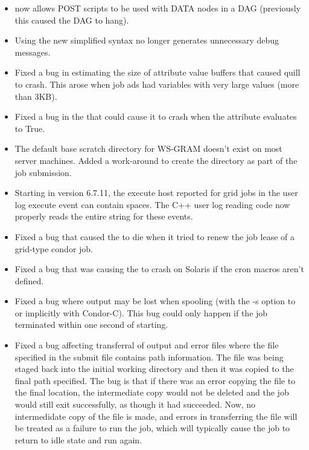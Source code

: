 \begin{itemize}
\item {} now allows POST scripts to be used with DATA
nodes in a DAG (previously this caused the DAG to hang).

\item Using the new  simplified syntax no longer
generates unnecessary debug messages.

\item Fixed a bug in estimating the size of attribute value buffers that
caused quill to crash.  This arose when job ads had variables with very
large values (more than 3KB).  

\item Fixed a bug in the  that could cause it to crash
when the  attribute evaluates to True.

\item The default base scratch directory for WS-GRAM doesn't exist on most
server machines. Added a work-around to create the directory as part of the
job submission.

\item Starting in version 6.7.11, the execute host reported for grid jobs
in the user log execute event can contain spaces. The C++ user log reading
code now properly reads the entire string for these events.

\item Fixed a bug that caused the  to die when it 
tried to renew the job lease of a grid-type condor job.

\item Fixed a bug that was causing the  to crash on Solaris
if the cron macros aren't defined.

\item Fixed a bug where output may be lost when spooling (with the -s option to
 or implicitly with Condor-C).  This bug could only happen if
the job terminated within one second of starting.

\item Fixed a bug affecting transferral of output and error files where the
file specified in the submit file contains path information.  The file
was being staged back into the initial working directory and then it was
copied to the final path specified.  The bug is that if there was an error
copying the file to the final location, the intermediate copy would not
be deleted and the job would still exit successfully, as though it had
succeeded.  Now, no intermedidate copy of the file is made, and errors
in transferring the file will be treated as a failure to run the job,
which will typically cause the job to return to idle state and run again.

\end{itemize}

